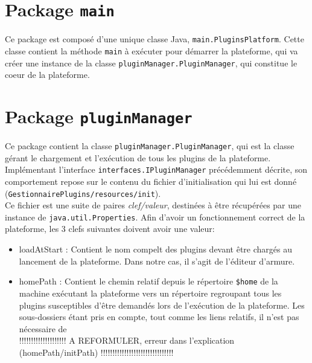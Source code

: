 \section{Package \texttt{main}}

Ce package est composé d'une unique classe Java, \texttt{main.PluginsPlatform}. Cette classe contient la méthode \texttt{main} à exécuter pour démarrer la plateforme, qui va créer une instance de la classe \texttt{pluginManager.PluginManager}, qui constitue le coeur de la plateforme.


\section{Package \texttt{pluginManager}}

Ce package contient la classe \texttt{pluginManager.PluginManager}, qui est la classe gérant le chargement et l'exécution de tous les plugins de la plateforme. Implémentant l'interface \texttt{interfaces.IPluginManager} précédemment décrite, son comportement repose sur le contenu du fichier d'initialisation qui lui est donné (\texttt{GestionnairePlugins/resources/init}).\\

Ce fichier est une suite de paires \textit{clef/valeur}, destinées à être récupérées par une instance de \texttt{java.util.Properties}. Afin d'avoir un fonctionnement correct de la plateforme, les 3 clefs suivantes doivent avoir une valeur:\\

\begin{itemize}
	\item loadAtStart : Contient le nom compelt des plugins devant être chargés au lancement de la plateforme. Dans notre cas, il s'agit de l'éditeur d'armure.
	\item homePath : Contient le chemin relatif depuis le répertoire \texttt{\$home} de la machine exécutant la plateforme vers un répertoire regroupant tous les plugins susceptibles d'être demandés lors de l'exécution de la plateforme. Les sous-dossiers étant pris en compte, tout comme les liens relatifs, il n'est pas nécessaire de \\
	!!!!!!!!!!!!!!!!!!!! A REFORMULER, erreur dans l'explication (homePath/initPath) !!!!!!!!!!!!!!!!!!!!!!!!!!!!!!!
\end{itemize}

